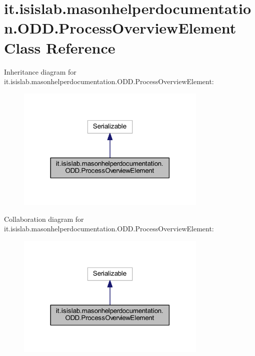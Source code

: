 \hypertarget{classit_1_1isislab_1_1masonhelperdocumentation_1_1_o_d_d_1_1_process_overview_element}{\section{it.\-isislab.\-masonhelperdocumentation.\-O\-D\-D.\-Process\-Overview\-Element Class Reference}
\label{classit_1_1isislab_1_1masonhelperdocumentation_1_1_o_d_d_1_1_process_overview_element}
}


Inheritance diagram for it.\-isislab.\-masonhelperdocumentation.\-O\-D\-D.\-Process\-Overview\-Element\-:
\nopagebreak
\begin{figure}[H]
\begin{center}
\leavevmode
\includegraphics[width=258pt]{classit_1_1isislab_1_1masonhelperdocumentation_1_1_o_d_d_1_1_process_overview_element__inherit__graph}
\end{center}
\end{figure}


Collaboration diagram for it.\-isislab.\-masonhelperdocumentation.\-O\-D\-D.\-Process\-Overview\-Element\-:
\nopagebreak
\begin{figure}[H]
\begin{center}
\leavevmode
\includegraphics[width=258pt]{classit_1_1isislab_1_1masonhelperdocumentation_1_1_o_d_d_1_1_process_overview_element__coll__graph}
\end{center}
\end{figure}
